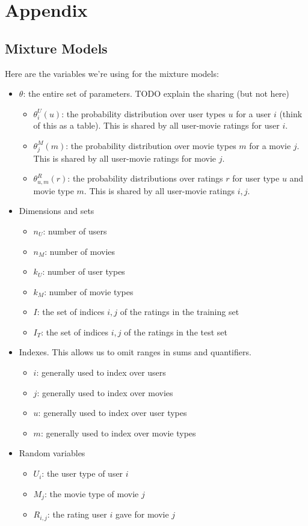 \documentclass{article}
\begin{document}
\section{Appendix}

\subsection{Mixture Models}
\label{sec:appendix-mixture}

Here are the variables we're using for the mixture models:

\begin{itemize}
\item $\theta$: the entire set of parameters. TODO explain the sharing
  (but not here)
  \begin{itemize}
  \item $\theta^U_i(u)$: the probability distribution over user types
    $u$ for a user $i$ (think
    of this as a table). This is shared by all user-movie ratings for
    user $i$.
  \item $\theta^M_j(m)$: the probability distribution over movie
    types $m$ for a movie $j$. This is shared by all user-movie ratings for movie $j$.
  \item $\theta^R_{u,m}(r)$: the probability distributions over
    ratings $r$ for user type $u$ and movie type $m$. This is shared
    by all user-movie ratings $i,j$.
  \end{itemize}
\item Dimensions and sets
  \begin{itemize}
  \item $n_U$: number of users
  \item $n_M$: number of movies
  \item $k_U$: number of user types
  \item $k_M$: number of movie types
  \item $I$: the set of indices $i,j$ of the ratings in the training
    set
  \item $I_T$: the set of indices $i,j$ of the ratings in the test set
  \end{itemize}
\item Indexes. This allows us to omit ranges in sums and quantifiers.
  \begin{itemize}
  \item $i$: generally used to index over users
  \item $j$: generally used to index over movies
  \item $u$: generally used to index over user types
  \item $m$: generally used to index over movie types
  \end{itemize}
\item Random variables
  \begin{itemize}
  \item $U_i$: the user type of user $i$
  \item $M_j$: the movie type of movie $j$
  \item $R_{i,j}$: the rating user $i$ gave for movie $j$
  \end{itemize}
\end{itemize}

\footnotesize


\end{document}
